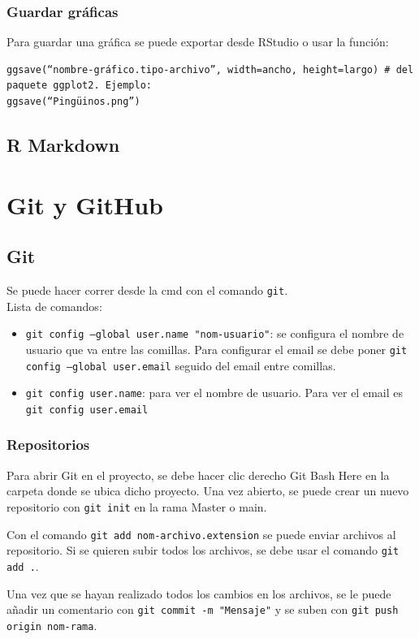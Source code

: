 \documentclass[a4paper, 12pt]{book}
\begin{document}
\subsection{Guardar gráficas}
Para guardar una gráfica se puede exportar desde RStudio o usar la función:
\begin{verbatim} 
ggsave(“nombre-gráfico.tipo-archivo”, width=ancho, height=largo) # del paquete ggplot2. Ejemplo:
ggsave(“Pingüinos.png”)
\end{verbatim}
\section{R Markdown}
%
\chapter{Git y GitHub}
\section{Git}
Se puede hacer correr desde la cmd con el comando \texttt{git}. \\
Lista de comandos:
\begin{itemize}
\item \texttt{git config --global user.name "nom-usuario"}: se configura el nombre de usuario que va entre las comillas. Para configurar el email se debe poner \texttt{git config --global user.email} seguido del email entre comillas.
\item \texttt{git config user.name}: para ver el nombre de usuario. Para ver el email es \texttt{git config user.email}
\end{itemize}
\subsection{Repositorios}
Para abrir Git en el proyecto, se debe hacer clic derecho Git Bash Here en la carpeta donde se ubica dicho proyecto. Una vez abierto, se puede crear un nuevo repositorio con \texttt{git init} en la rama Master o main.

Con el comando \texttt{git add nom-archivo.extension} se puede enviar archivos al repositorio. Si se quieren subir todos los archivos, se debe usar el comando \texttt{git add .}.

Una vez que se hayan realizado todos los cambios en los archivos, se le puede añadir un comentario con \texttt{git commit -m "Mensaje"} y se suben con \texttt{git push origin nom-rama}.
\end{document}
